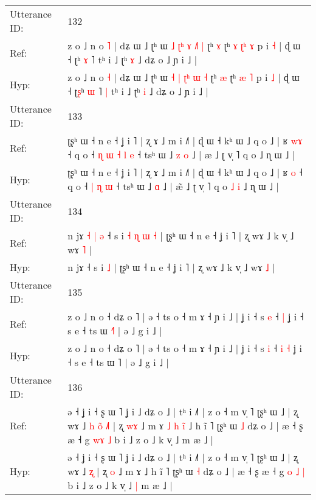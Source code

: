 \documentclass[10pt]{article}
\DeclareRobustCommand{\hl}[1]{{\textcolor{red}{#1}}}
\begin{document}
\begin{longtable}{ll}
\midrule
Utterance ID: & 132 \\
Ref: & z o ˩ n o \hl{˥} | dʑ ɯ ˩ ʈʰ ɯ \hl{˩} \hl{ʈ}\hl{ʰ} \hl{ɤ}\hl{ }\hl{˩}\hl{˥} \hl{|} ʈʰ \hl{ɤ} ʈʰ\hl{ }\hl{ɤ} \hl{ʈ}\hl{ʰ} \hl{ɤ} p i \hl{˧} | ɖ ɯ ˧ ʈ\hl{}ʰ \hl{ɤ} ˥\hl{}\hl{} tʰ i ˩ ʈʰ \hl{ɤ} ˩ dʑ o ˩ ɲ i ˩ |
 \\
Hyp: & z o ˩ n o \hl{˧} | dʑ ɯ ˩ ʈʰ ɯ \hl{˧} \hl{}\hl{|} \hl{ʈ}\hl{ʰ}\hl{ }\hl{ɯ} \hl{˧} ʈʰ \hl{æ} ʈʰ\hl{}\hl{} \hl{}\hl{æ} \hl{˥} p i \hl{˩} | ɖ ɯ ˧ ʈ\hl{ʂ}ʰ \hl{ɯ} ˥\hl{ }\hl{|} tʰ i ˩ ʈʰ \hl{i} ˩ dʑ o ˩ ɲ i ˩ |
 \\
\midrule
Utterance ID: & 133 \\
Ref: & ʈʂʰ ɯ ˧ n e ˧ ʝ i ˥ | ʐ ɤ ˩ m i ˩˥ | ɖ ɯ ˧ kʰ ɯ ˩ q o ˩ | ʁ \hl{w}\hl{ɤ} ˧ q o ˧\hl{ }\hl{ɳ}\hl{ }\hl{ɯ} \hl{˧} \hl{l} \hl{e} ˧ tsʰ ɯ ˩\hl{ }\hl{z} \hl{o} ˩ | æ\hl{} ˩ ʈ v̩ ˥ q o\hl{}\hl{}\hl{}\hl{} ˩ ɳ ɯ ˩ |
 \\
Hyp: & ʈʂʰ ɯ ˧ n e ˧ ʝ i ˥ | ʐ ɤ ˩ m i ˩˥ | ɖ ɯ ˧ kʰ ɯ ˩ q o ˩ | ʁ \hl{}\hl{o} ˧ q o ˧\hl{}\hl{}\hl{}\hl{} \hl{|} \hl{ɳ} \hl{ɯ} ˧ tsʰ ɯ ˩\hl{}\hl{} \hl{ɑ} ˩ | æ\hl{̃} ˩ ʈ v̩ ˥ q o\hl{ }\hl{˩}\hl{ }\hl{i} ˩ ɳ ɯ ˩ |
 \\
\midrule
Utterance ID: & 134 \\
Ref: & n jɤ\hl{ }\hl{˧}\hl{ }\hl{|}\hl{ }\hl{ə} ˧ s i\hl{ }\hl{˧}\hl{ }\hl{ɳ}\hl{ }\hl{ɯ} \hl{˧} | ʈʂʰ ɯ ˧ n e ˧ ʝ i ˥ | ʐ wɤ ˩ k v̩ ˩ wɤ \hl{˥} |
 \\
Hyp: & n jɤ\hl{}\hl{}\hl{}\hl{}\hl{}\hl{} ˧ s i\hl{}\hl{}\hl{}\hl{}\hl{}\hl{} \hl{˩} | ʈʂʰ ɯ ˧ n e ˧ ʝ i ˥ | ʐ wɤ ˩ k v̩ ˩ wɤ \hl{˩} |
 \\
\midrule
Utterance ID: & 135 \\
Ref: & z o ˩ n o ˧ dʑ o ˥ | ə ˧ ts o ˧ m ɤ ˧ ɲ i ˩ | ʝ i ˧ s \hl{e} ˧\hl{}\hl{} \hl{|} ʝ i ˧ s e ˧ ts ɯ \hl{˧}˥ | ə ˩ g i ˩ |
 \\
Hyp: & z o ˩ n o ˧ dʑ o ˥ | ə ˧ ts o ˧ m ɤ ˧ ɲ i ˩ | ʝ i ˧ s \hl{i} ˧\hl{ }\hl{i} \hl{˧} ʝ i ˧ s e ˧ ts ɯ \hl{}˥ | ə ˩ g i ˩ |
 \\
\midrule
Utterance ID: & 136 \\
Ref: & ə ˧ ʝ i ˧ ʂ ɯ ˥ ʝ i ˩ dʑ o ˩ | tʰ i ˩˥ | z o ˧ m v̩ ˥ ʈʂʰ ɯ ˩ | ʐ wɤ ˩\hl{ }\hl{h}\hl{ }\hl{o}\hl{̃} \hl{˩}\hl{˥} | ʐ \hl{w}\hl{ɤ} ˩ m ɤ\hl{ }\hl{˩}\hl{ }\hl{h}\hl{ }\hl{i}\hl{̃} ˩ h ĩ ˥ ʈʂʰ ɯ \hl{˩} dʑ o ˩ | æ ˧ ʂ æ ˧ g \hl{}\hl{w}\hl{ɤ} \hl{˩} b i ˩ z o ˩ k v̩ ˩\hl{}\hl{} m æ ˩ |
 \\
Hyp: & ə ˧ ʝ i ˧ ʂ ɯ ˥ ʝ i ˩ dʑ o ˩ | tʰ i ˩˥ | z o ˧ m v̩ ˥ ʈʂʰ ɯ ˩ | ʐ wɤ ˩\hl{}\hl{}\hl{}\hl{}\hl{} \hl{}\hl{ʐ} | ʐ \hl{}\hl{o} ˩ m ɤ\hl{}\hl{}\hl{}\hl{}\hl{}\hl{}\hl{} ˩ h ĩ ˥ ʈʂʰ ɯ \hl{˧} dʑ o ˩ | æ ˧ ʂ æ ˧ g \hl{o}\hl{ }\hl{˩} \hl{|} b i ˩ z o ˩ k v̩ ˩\hl{ }\hl{|} m æ ˩ |

\end{longtable}
\end{document}

